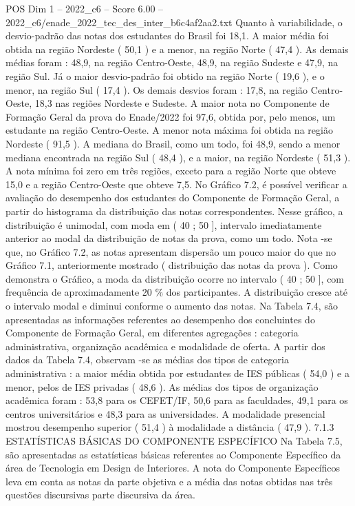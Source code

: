 \begin{textsample}{POS Dim 1 – 2022\_c6 – Score 6.00 – 2022\_c6/enade\_2022\_tec\_des\_inter\_b6c4af2aa2.txt}
Quanto à variabilidade, o desvio-padrão das notas dos estudantes do Brasil foi 18,1.
A maior média foi obtida na região Nordeste ( 50,1 ) e a menor, na região Norte ( 47,4 ).
As demais médias foram : 48,9, na região Centro-Oeste, 48,9, na região Sudeste e 47,9, na região Sul.
Já o maior desvio-padrão foi obtido na região Norte ( 19,6 ), e o menor, na região Sul ( 17,4 ).
Os demais desvios foram : 17,8, na região Centro-Oeste, 18,3 nas regiões Nordeste e Sudeste.
A maior nota no Componente de Formação Geral da prova do Enade/2022 foi 97,6, obtida por, pelo menos, um estudante na região Centro-Oeste.
A menor nota máxima foi obtida na região Nordeste ( 91,5 ).
A mediana do Brasil, como um todo, foi 48,9, sendo a menor mediana encontrada na região Sul ( 48,4 ), e a maior, na região Nordeste ( 51,3 ).
A nota mínima foi zero em três regiões, exceto para a região Norte que obteve 15,0 e a região Centro-Oeste que obteve 7,5.
No Gráfico 7.2, é possível verificar a avaliação do desempenho dos estudantes do Componente de Formação Geral, a partir do histograma da distribuição das notas correspondentes.
Nesse gráfico, a distribuição é unimodal, com moda em ( 40 ; 50 ], intervalo imediatamente anterior ao modal da distribuição de notas da prova, como um todo.
Nota -se que, no Gráfico 7.2, as notas apresentam dispersão um pouco maior do que no Gráfico 7.1, anteriormente mostrado ( distribuição das notas da prova ).
Como demonstra o Gráfico, a moda da distribuição ocorre no intervalo ( 40 ; 50 ], com frequência de aproximadamente 20 \% dos participantes.
A distribuição cresce até o intervalo modal e diminui conforme o aumento das notas.
Na Tabela 7.4, são apresentadas as informações referentes ao desempenho dos concluintes do Componente de Formação Geral, em diferentes agregações : categoria administrativa, organização acadêmica e modalidade de oferta.
A partir dos dados da Tabela 7.4, observam -se as médias dos tipos de categoria administrativa : a maior média obtida por estudantes de IES públicas ( 54,0 ) e a menor, pelos de IES privadas ( 48,6 ).
As médias dos tipos de organização acadêmica foram : 53,8 para os CEFET/IF, 50,6 para as faculdades, 49,1 para os centros universitários e 48,3 para as universidades.
A modalidade presencial mostrou desempenho superior ( 51,4 ) à modalidade a distância ( 47,9 ). 7.1.3 ESTATÍSTICAS BÁSICAS DO COMPONENTE ESPECÍFICO Na Tabela 7.5, são apresentadas as estatísticas básicas referentes ao Componente Específico da área de Tecnologia em Design de Interiores.
A nota do Componente Específicos leva em conta as notas da parte objetiva e a média das notas obtidas nas três questões discursivas parte discursiva da área.

\end{textsample}
